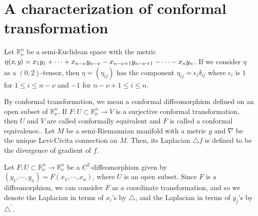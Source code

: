 \documentclass[a4paper,10pt]{amsart}
\theoremstyle{plain}
\newtheorem*{main theorem}{Theorem}
\theoremstyle{definition}
\begin{document}
\section{A characterization of conformal transformation} \label{section:2}

Let $\mathbb{R}^n_\nu$ be a semi-Euclidean space with the metric
$\eta( \emph{x}, \emph{y}) = x_1 y_1 + \cdots + x_{n-\nu}
y_{n-\nu} - x_{n-\nu+1} y_{n-\nu+1} - \cdots - x_n y_n$. If we
consider $\eta$ as a $(0,2)$-tensor, then $\eta = (\eta_{ij})$ has
the component $\eta_{ij} = \epsilon_i \delta_{ij}$ where
$\epsilon_i$ is $1$ for $1 \leq i \leq n-\nu$ and $-1$ for
$n-\nu+1 \leq i \leq n$.

By conformal transformation, we mean a conformal diffeomorphism
defined on an open subset of $\mathbb{R}^n_\nu$. If $F : U \subset
\mathbb{R}^n_\nu \rightarrow V$ is a surjective conformal
transformation, then $U$ and $V$ are called conformally equivalent
and $F$ is called a conformal equivalence.. Let $M$ be a
semi-Riemannian manifold with a metric $g$ and $\nabla$ be the
unique Levi-Civita connection on $M$. Then, its Laplacian
$\triangle f$ is defined to be the divergence of gradient of $f$.

Let $F : U \subset \mathbb{R}^n_\nu \rightarrow \mathbb{R}^n_\nu$
be a $C^2$-diffeomorphism given by $(y_1, \cdots, y_n) = F(x_1,
\cdots, x_n)$, where $U$ is an open subset. Since $F$ is a
diffeomorphism, we can consider $F$ as a coordinate
transformation, and so we denote the Laplacian in terms of $x_i$'s
by $\triangle$, and the Laplacian in terms of $y_j$'s by
$\triangle^\prime$.
\end{document}
